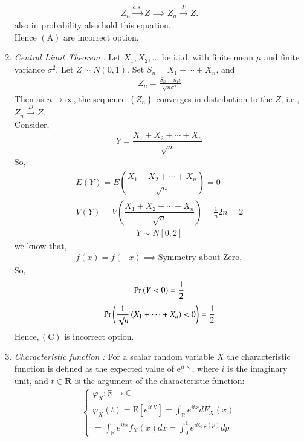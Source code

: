 \documentclass[journal,12pt,twocolumn]{IEEEtran}
\begin{document}
\begin{enumerate}[label=\alph*)]
\begin{align}
 Z_n \stackrel{a.s.}{\rightarrow} Z \implies Z_n \stackrel{P}{\rightarrow} Z.
\end{align}
also in probability also hold this equation.\\
Hence $(\mathrm{A})$ are incorrect option.  
\item 
{\em Central Limit Theorem : }Let $X_{1}, X_{2}, \ldots$ be i.i.d. with finite mean $\mu$ and finite variance $\sigma^{2}$. Let $Z \sim N(0,1) .$ Set $S_{n}=X_{1}+\cdots+X_{n}$, and
\begin{align}
Z_{n}=\frac{S_{n}-n \mu}{\sqrt{n \sigma^{2}}}
\end{align}
Then as $n \rightarrow \infty$, the sequence $\left\{Z_{n}\right\}$ converges in distribution to the $Z$, i.e., $Z_{n} \stackrel{D}{\rightarrow} Z$.\\
Consider,
\begin{align}
Y=\dfrac{X_{1}+ X_{2}+ \cdots + X_n}{\sqrt{n}}
\end{align}
So,
\begin{align}
E(Y)= E\left(\dfrac{X_{1}+ X_{2}+ \cdots+X_n}{\sqrt{n}}\right)= 0\\
V(Y)= V\left(\dfrac{X_{1}+ X_{2}+ \cdots+X_n}{\sqrt{n}}\right)= \frac{1}{n}2n=2
\end{align}
\begin{align}
Y \sim N[0,2]
\end{align}
we know that,
\begin{align}
f(x)=f(-x)\implies \text{Symmetry about Zero},
\end{align}
So,
\begin{align}
\Pr\left(Y<0\right)=\frac{1}{2}
\end{align}
\begin{align}
\Pr\left(\dfrac{1}{\sqrt{n}}\left(X_{1}+\cdots+X_{n}\right)<0\right)=\frac{1}{2}
\end{align}
Hence$,(\mathrm{C})$ is incorrect option.
\item {\em Characteristic function : }For a scalar random variable $X$ the characteristic function is defined as the expected value of $\mathrm{e}^{i t \times}$, where $i$ is the imaginary unit, and $t \in \mathbf{R}$ is the argument of the characteristic function:
\begin{align}
\left\{\begin{array}{l}
\varphi_{X}: \mathbb{R} \rightarrow \mathbb{C} \\
\varphi_{X}(t)=\mathrm{E}\left[e^{i t X}\right]=\int_{\mathbb{R}} e^{i t x} d F_{X}(x)\\=\int_{\mathbb{R}} e^{i t x} f_{X}(x) d x=\int_{0}^{1} e^{i t Q_{X}(p)} d p

\end{array}
\end{align}
\end{enumerate}
\end{document}
